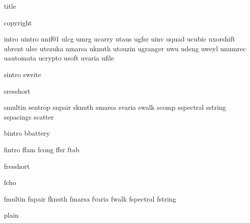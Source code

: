 \documentclass[12pt]{report}
\newif\ifdetailed\detailedfalse
\begin{document}
 {title}

 {copyright}
\tableofcontents
\clearpage


 {intro}
 {uintro}
 {unif01}
 {ulcg}
 {umrg}
 {ucarry}
 {utaus}
 {ugfsr}
 {uinv}
 {uquad}
 {ucubic}
 {uxorshift}
 {ubrent}
 {ulec}
 {utezuka}
 {umarsa}
 {uknuth}
 {utouzin}
 {ugranger}
 {uwu}
 {udeng}
 {uweyl}
 {unumrec}
 {uautomata}
 {ucrypto}
 {usoft}
 {uvaria}
 {ufile}

 {sintro}
 {swrite}
\ifdetailed
    {sres}
\else
    {sresshort}
\fi
 {smultin}
 {sentrop}
 {snpair}
 {sknuth}
 {smarsa}
 {svaria}
 {swalk}
 {scomp}
 {sspectral}
 {sstring}
 {sspacings}
 {scatter}

 {bintro}
 {bbattery}

 {fintro}
 {ffam}
 {fcong}
 {ffsr}
 {ftab}
\ifdetailed
    {fres}
\else
    {fresshort}
\fi
 {fcho}

 {fmultin}
 {fnpair}
 {fknuth}
 {fmarsa}
 {fvaria}
 {fwalk}
 {fspectral}
 {fstring}


 {plain}

\clearpage
{}

\end{document}
